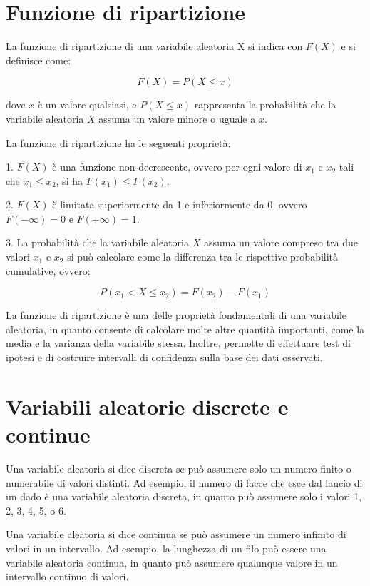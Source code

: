 \section{Funzione di ripartizione}

La funzione di ripartizione di una variabile aleatoria X si indica con $F(X)$ e si definisce come:

$$F(X) = P(X \leq x)$$

dove $x$ è un valore qualsiasi, e $P(X \leq x)$ rappresenta la probabilità che la variabile aleatoria $X$ assuma un valore minore o uguale a $x$.

La funzione di ripartizione ha le seguenti proprietà:

1. $F(X)$ è una funzione non-decrescente, ovvero per ogni valore di $x_1$ e $x_2$ tali che $x_1 \leq x_2$, si ha $F(x_1) \leq F(x_2)$.

2. $F(X)$ è limitata superiormente da 1 e inferiormente da 0, ovvero $F(-\infty) = 0$ e $F(+\infty) = 1$.

3. La probabilità che la variabile aleatoria $X$ assuma un valore compreso tra due valori $x_1$ e $x_2$ si può calcolare come la differenza tra le rispettive probabilità cumulative, ovvero:

$$P(x_1 < X \leq x_2) = F(x_2) - F(x_1)$$

La funzione di ripartizione è una delle proprietà fondamentali di una variabile aleatoria, in quanto consente di calcolare molte altre quantità importanti, come la media e la varianza della variabile stessa. Inoltre, permette di effettuare test di ipotesi e di costruire intervalli di confidenza sulla base dei dati osservati.

\section{Variabili aleatorie discrete e continue}
Una variabile aleatoria si dice discreta se può assumere solo un numero finito o numerabile di valori distinti. Ad esempio, il numero di facce che esce dal lancio di un dado è una variabile aleatoria discreta, in quanto può assumere solo i valori 1, 2, 3, 4, 5, o 6.

Una variabile aleatoria si dice continua se può assumere un numero infinito di valori in un intervallo. Ad esempio, la lunghezza di un filo può essere una variabile aleatoria continua, in quanto può assumere qualunque valore in un intervallo continuo di valori.


